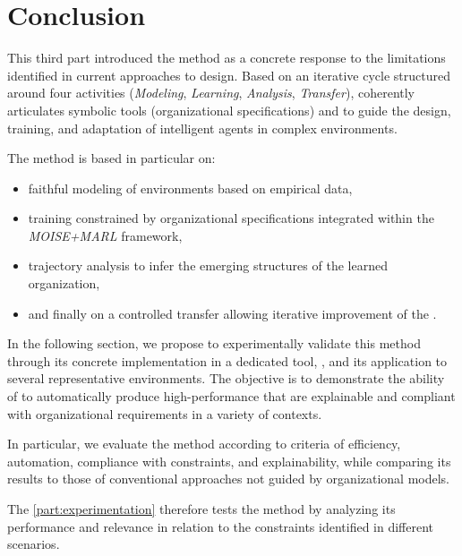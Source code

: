 \clearpage
\thispagestyle{empty}
\null
\newpage

\chapter*{Conclusion}

\noindent
This third part introduced the \textbf{} method as a concrete response to the limitations identified in current approaches to  design. Based on an iterative cycle structured around four activities (\textit{Modeling}, \textit {Learning}, \textit{Analysis}, \textit{Transfer}),  coherently articulates symbolic tools (organizational specifications) and  to guide the design, training, and adaptation of intelligent agents in complex environments.

\medskip

\noindent
The method is based in particular on:
\begin{itemize}
  \item faithful modeling of environments based on empirical data,
  \item training constrained by organizational specifications integrated within the \textit{MOISE+MARL} framework,
  \item trajectory analysis to infer the emerging structures of the learned organization,
  \item and finally on a controlled transfer allowing iterative improvement of the .
\end{itemize}

\noindent
In the following section, we propose to experimentally validate this method through its concrete implementation in a dedicated tool, , and its application to several representative environments. The objective is to demonstrate the ability of  to automatically produce high-performance  that are explainable and compliant with organizational requirements in a variety of contexts.

\medskip

\noindent
In particular, we evaluate the method according to criteria of efficiency, automation, compliance with constraints, and explainability, while comparing its results to those of conventional approaches not guided by organizational models.

\bigskip

The \autoref{part:experimentation} therefore tests the  method by analyzing its performance and relevance in relation to the constraints identified in different scenarios.